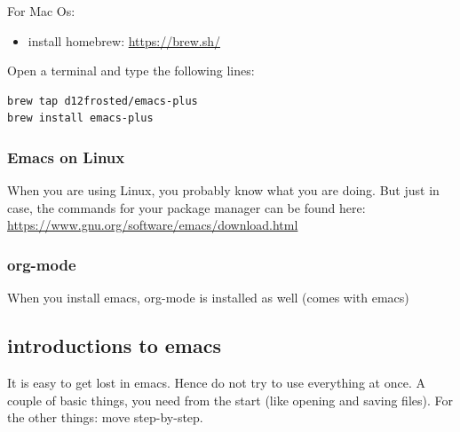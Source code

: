 \documentclass[11pt]{article}
\begin{document}
For Mac Os:
\begin{itemize}
\item install homebrew: \url{https://brew.sh/}
\end{itemize}

Open a terminal and type the following lines:

\begin{verbatim}
brew tap d12frosted/emacs-plus
brew install emacs-plus
\end{verbatim}

\subsubsection{Emacs on Linux}

When you are using Linux, you probably know what you are doing. But just in case, the commands for your package manager can be found here: \url{https://www.gnu.org/software/emacs/download.html}


\subsubsection{org-mode}

When you install emacs, org-mode is installed as well (comes with emacs)


\subsection{introductions to emacs}

It is easy to get lost in emacs. Hence do not try to use everything at once. A couple of basic things, you need from the start (like opening and saving files). For the other things: move step-by-step. 
\end{document}
